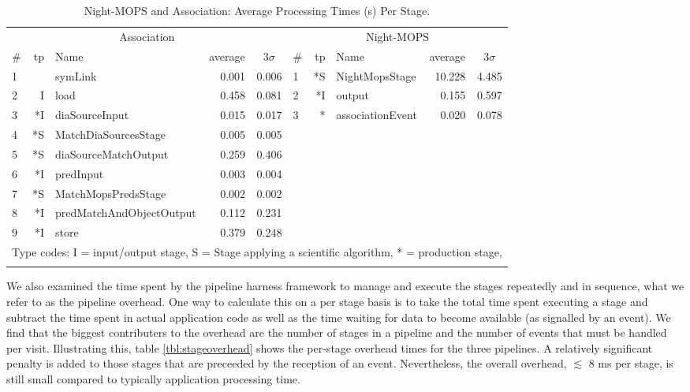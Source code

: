 \begin{table}[htbp]
\begin{center}
\small
\caption{Night-MOPS and Association: Average Processing Times (s) Per
  Stage.
\label{tbl:otherstagetimes}}
\vspace{\baselineskip}
\begin{tabular}{lrlrr|lrlrr}
\hline\hline
\multicolumn{5}{c|}{Association} & \multicolumn{5}{c}{Night-MOPS} \\
\# & tp & Name & \multicolumn{1}{c}{average}&\multicolumn{1}{c|}{$3\sigma$} &
\# & tp & Name & \multicolumn{1}{c}{average}&\multicolumn{1}{c}{$3\sigma$} \\ 
\hline
1 &    & symLink                  &  0.001 &  0.006 & 1 & *S & NightMopsStage           & 10.228 &  4.485 \\ 
2 &  I & load                     &  0.458 &  0.081 & 2 & *I & output                   &  0.155 &  0.597 \\ 
3 & *I & diaSourceInput           &  0.015 &  0.017 & 3 & *\phantom{I}  & associationEvent         &  0.020 &  0.078 \\ 
4 & *S & MatchDiaSourcesStage     &  0.005 &  0.005 &&&&&\\ 
5 & *S & diaSourceMatchOutput     &  0.259 &  0.406 &&&&&\\ 
6 & *I & predInput                &  0.003 &  0.004 &&&&&\\ 
7 & *S & MatchMopsPredsStage      &  0.002 &  0.002 &&&&&\\ 
8 & *I & predMatchAndObjectOutput &  0.112 &  0.231 &&&&&\\ 
9 & *I & store                    &  0.379 &  0.248 &&&&&\\ 
\hline
\multicolumn{10}{l}{Type codes: I = input/output stage, S = Stage
  applying a scientific algorithm, * = production stage,} \\
\multicolumn{5}{l}{} \\
\end{tabular}
\end{center}
\end{table}

We also examined the time spent by the pipeline harness
framework to manage and execute the stages repeatedly and in
sequence, what we refer to as the pipeline overhead.  One way to
calculate this on a per stage basis is to take the total time spent
executing a stage and subtract the time spent in actual application
code as well as the time waiting for data to become available (as
signalled by an event).  We find that the biggest contributers to the
overhead are the number of stages in a pipeline and the number of
events that must be handled per visit.  Illustrating this,
table \ref{tbl:stageoverhead} shows the per-stage overhead times for
the three pipelines.  A relatively significant penalty is added to
those stages that are preceeded by the reception of an event.
Nevertheless, the overall overhead, $\lesssim $ 8 ms per stage, is still
small compared to typically application processing time.  


